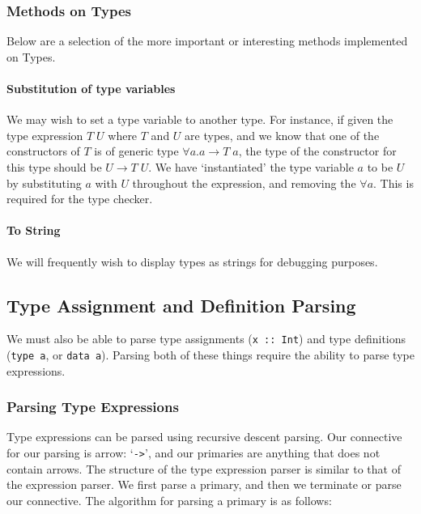 \subsubsection{Methods on Types}
Below are a selection of the more important or interesting methods implemented on Types.

\paragraph{Substitution of type variables} We may wish to set a type variable to another type. For instance, if given the type expression \(T \; U\) where \(T\) and \(U\) are types, and we know that one of the constructors of \(T\) is of generic type \(\forall a.a \rightarrow T \; a\), the type of the constructor for this type should be \(U \rightarrow T \; U\). We have `instantiated' the type variable \(a\) to be \(U\) by substituting \(a\) with \(U\) throughout the expression, and removing the \(\forall a\). This is required for the type checker. 

\paragraph{To String} We will frequently wish to display types as strings for debugging purposes. 
\subsection{Type Assignment and Definition Parsing}
We must also be able to parse type assignments (\verb|x :: Int|) and type definitions (\verb|type a|, or \verb|data a|). Parsing both of these things require the ability to parse type expressions. 

\subsubsection{Parsing Type Expressions}
Type expressions can be parsed using recursive descent parsing. Our connective for our parsing is arrow: `\verb|->|', and our primaries are anything that does not contain arrows. The structure of the type expression parser is similar to that of the expression parser. We first parse a primary, and then we terminate or parse our connective. The algorithm for parsing a primary is as follows:

